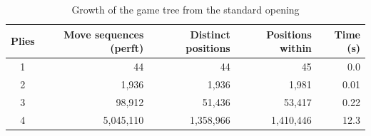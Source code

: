\begin{table}[!htbp]
\centering\caption{Growth of the game tree from the standard opening}\label{tab:tree}
\footnotesize
\begin{tabular}{@{}crrrr@{}}
\toprule
Plies & Move sequences (perft) & Distinct positions & Positions within & Time (s) \\
\midrule
1 & 44 & 44 & 45 & 0.0 \\
2 & 1,936 & 1,936 & 1,981 & 0.01 \\
3 & 98,912 & 51,436 & 53,417 & 0.22 \\
4 & 5,045,110 & 1,358,966 & 1,410,446 & 12.3 \\
\bottomrule
\end{tabular}
\par\vspace{2pt}{\scriptsize Iterative deepening to depth 4 re-expands 2.0\% more nodes than a single depth-limited pass; a position takes 16 bytes.}
\end{table}
